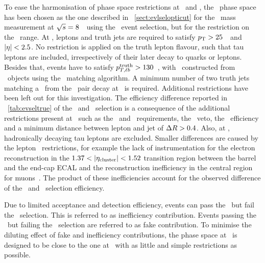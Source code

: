 To ease the harmonisation of phase space restrictions at \truel\ and \recolevel, the \recolevel\ phase space has been chosen as the one described in \sect~\ref{sect:evlselopticut} for the \tquark\ mass measurement at ${\sqrt{s}}=8$~\TeV\ using the \cutbased\ event selection, but for the restriction on the \mlbr\ range. 
At \truelevel, leptons and truth jets are required to satisfy $p_\mathrm{T}>25$~\GeV\ and $|\eta|<2.5$. No restriction is applied on the truth lepton flavour, such that tau leptons are included, irrespectively of their later decay to quarks or leptons. Besides that, events have to satisfy $p_{T,\ell b}^{\mathrm{truth}}>130$~\GeV, with \ptlbt\ constructed from \truelevel\ objects using the \mlb\ matching algorithm. A minimum number of two truth jets matching a \bquark\ from the \tquark\ pair decay at \genlevel\ is required. Additional restrictions have been left out for this investigation.
%
The efficiency difference reported in \tab~\ref{tab:evseltrue} of the \truel\ and \recolevel\ selection is a consequence of the additional restrictions present at \recolevel\ such as the \met\ and \Ht\ requirements, the \Zboson\ veto, the \btag\ efficiency and a minimum distance between lepton and jet of $\Delta R>0.4$. Also, at \recolevel, hadronically decaying tau leptons are excluded. Smaller differences are caused by the lepton \abseta\ restrictions, for example the lack of instrumentation for the electron reconstruction in the $1.37<\vert\eta_\mathrm{cluster}\vert<1.52$ transition region between the barrel and the end-cap \gls{ECAL} and the reconstruction inefficiency in the central region for muons~\cite{CERN-PH-EP-2014-151}. The product of these inefficiencies account for the observed difference of the \truel\ and \recolevel\ selection efficiency.


Due to limited acceptance and detection efficiency, events can pass the \truelevel\ but fail the \recolevel\ selection. This is referred to as inefficiency contribution.
Events passing the \recolevel\ but failing the \truelevel\ selection are referred to as fake contribution. 
%
To minimise the diluting effect of fake and inefficiency contributions, the phase space at \truelevel\ is designed to be close to the one at \recolevel\ with as little and simple restrictions as possible.


